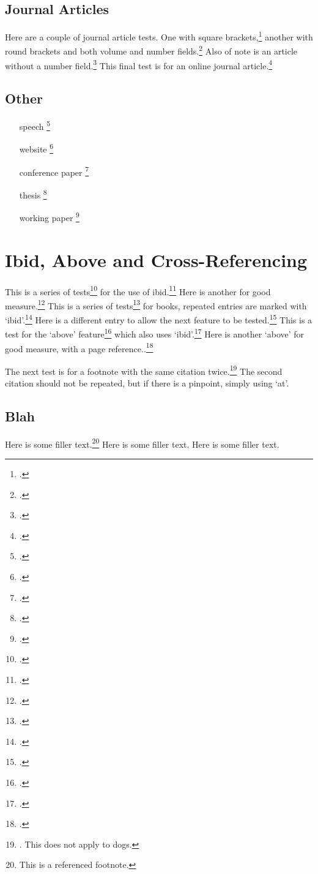 \documentclass[titlepage,11pt]{lawessay}
\begin{document}
\clearpage
\subsection{Journal Articles}
Here are a couple of journal article tests. One with square brackets,\footcite{Apps01} another with round brackets and both volume and number fields.\footcite{Apps06}
Also of note is an article without a number field.\footcite{Davis07}
This final test is for an online journal article.\footcite{Charlesworth07}

\clearpage
\subsection{Other}
\begin{itemize}
\item[speech] \cite{Gundotra09}\footcite{Gundotra09}
\item[website] \cite{Bennett08}\footcite{Bennett08}
\item[conference paper] \cite{Malcolm03}\footcite{Malcolm03}
\item[thesis] \cite{Twyford02}\footcite{Twyford02}
\item[working paper] \cite{Hillman09}\footcite{Hillman09}
\end{itemize}

\clearpage
\section{Ibid, Above and Cross-Referencing}
This is a series of tests\footcite{Amery} for the use of ibid.\footcite{Amery} Here is another for good measure.\footcite[23]{Amery}
This is a series of tests\footcite{Houston05} for books, 
repeated entries are marked with `ibid'.\footcite{Houston05} 
Here is a different  entry to allow the next feature to be tested.\footcite[23, 25]{Heymann05}
This is a test for the `above' feature\footcite{Houston05} which also uses `ibid'.\footcite[2]{Houston05} 
Here is another `above' for good measure, with a page reference..\footcite[23]{Heymann05}

The next test is for a footnote with the same citation twice.\footnote{\cite[23]{Houston05}. This does not apply to dogs\cite[54]{Houston05}.}
The second citation should not be repeated, but if there is a pinpoint, simply using `at'.

\subsection{Blah}
Here is some filler text.\footnote{\label{fntest}This is a referenced footnote.}
Here is some filler text.
Here is some filler text.
\end{document}
